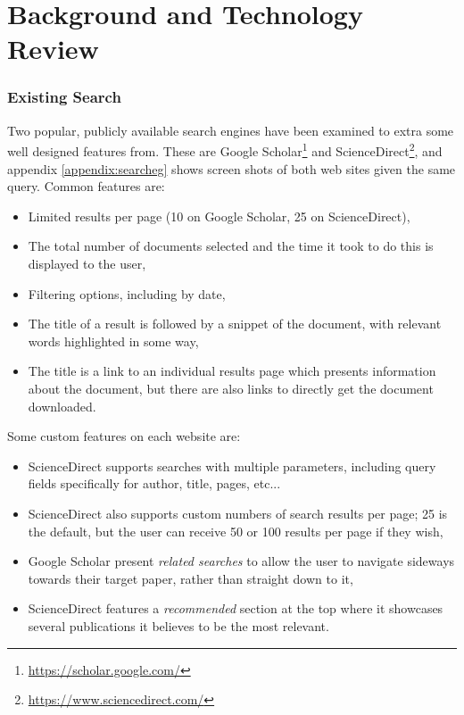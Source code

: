 \section{Background and Technology Review}
\subsubsection*{Existing Search}
Two popular, publicly available search engines have been examined to extra some well designed features from. These are Google Scholar\footnote{\href{https://scholar.google.com/}{https://scholar.google.com/}} and ScienceDirect\footnote{\href{https://www.sciencedirect.com/}{https://www.sciencedirect.com/}}, and appendix \ref{appendix:searcheg} shows screen shots of both web sites given the same query. Common features are:
\begin{itemize}
	\item Limited results per page (10 on Google Scholar, 25 on ScienceDirect),
	\item The total number of documents selected and the time it took to do this is displayed to the user,
	\item Filtering options, including by date,
	\item The title of a result is followed by a snippet of the document, with relevant words highlighted in some way,
	\item The title is a link to an individual results page which presents information about the document, but there are also links to directly get the document downloaded.
\end{itemize}

\noindent Some custom features on each website are:
\begin{itemize}
	\item ScienceDirect supports searches with multiple parameters, including query fields specifically for author, title, pages, etc...
	\item ScienceDirect also supports custom numbers of search results per page; 25 is the default, but the user can receive 50 or 100 results per page if they wish,
	\item Google Scholar present \textit{related searches} to allow the user to navigate sideways towards their target paper, rather than straight down to it,
	\item ScienceDirect features a \textit{recommended} section at the top where it showcases several publications it believes to be the most relevant.
\end{itemize}

